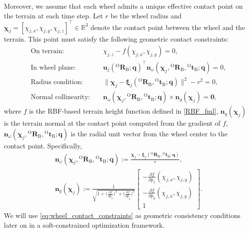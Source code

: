 \documentclass[journal,twoside,web]{ieeecolor}
\begin{document}
Moreover, we assume that each wheel admits a unique effective contact point on the terrain at each time step. Let $r$ be the wheel radius and \(\bm{\chi}_j=[\chi_{j,x},\chi_{j,y},\chi_{j,z}]^\top\in\mathbb{R}^3\) denote the contact point between the wheel and the terrain. 
This point must satisfy the following geometric contact constraints:
\begin{subequations}\label{eq:geom_constraints}
\begin{alignat}{2}
&\text{On terrain: }  && \chi_{j,z} - f(\chi_{j,x}, \chi_{j,y}) = 0,\\
&\text{In wheel plane: } && \mathbf{u}_j({}^{\text{O}}\mathbf{R}_\text{B}; \mathbf{q})^\top \mathbf{n}_\omega(\bm{\chi}_j,{}^{\text{O}}\mathbf{R}_\text{B}, {}^{\text{O}}\mathbf{t}_{\text{B}}; \mathbf{q}) = 0,\\
&\text{Radius condition: }  && \|\bm{\chi}_j \!-\! \bm\xi_j({}^{\text{O}}\mathbf{R}_\text{B},\! {}^{\text{O}}\mathbf{t}_{\text{B}}; \mathbf{q})\|^2 \!-\! r^2 \!=\! 0,\\
&\text{Normal collinearity: } && \mathbf{n}_\omega(\bm{\chi}_j,{}^{\text{O}}\mathbf{R}_\text{B}, {}^{\text{O}}\mathbf{t}_{\text{B}}; \mathbf{q}) \times \mathbf{n}_g(\bm{\chi}_j) \!=\! \mathbf{0},
\end{alignat}
\end{subequations}
where \(f\) is the RBF‑based terrain height function defined in \eqref{RBF_fml},
\(\mathbf{n}_g(\bm{\chi}_j)\) is the terrain normal at the contact point computed from the gradient of \(f\),  \(\mathbf{n}_\omega(\bm{\chi}_j,{}^{\text{O}}\mathbf{R}_\text{B}, {}^{\text{O}}\mathbf{t}_{\text{B}}; \mathbf{q})\) is the radial unit vector from the wheel center to the contact point. Specifically,
\begin{subequations}
\begin{align}
&\mathbf{n}_\omega(\bm{\chi}_j,{}^{\text{O}}\mathbf{R}_\text{B}, {}^{\text{O}}\mathbf{t}_{\text{B}}; \mathbf{q}) := \frac{\bm{\chi}_j - \bm\xi_j({}^{\text{O}}\mathbf{R}_\text{B}, {}^{\text{O}}\mathbf{t}_{\text{B}}; \mathbf{q})}{r},\\
&\mathbf{n}_g(\bm{\chi}_j) \!:=\! \frac{1}{\sqrt{1 \!\!+\! \!\bigl(\frac{\partial f}{\partial p_x}\bigr)^2\! \!+\!\! \bigl(\frac{\partial f}{\partial p_y}\bigr)^2}}\!
\begin{bmatrix}
-\frac{\partial f}{\partial p_x}(\chi_{j,x},\chi_{j,y}) \\[4pt]
-\frac{\partial f}{\partial p_y}(\chi_{j,x},\chi_{j,y}) \\[4pt]
1
\end{bmatrix}.
\end{align}
\label{eq:wheel_contact_constraints}
\end{subequations}
We will use \eqref{eq:wheel_contact_constraints} as geometric consistency conditions later on in a soft-constrained optimization framework.
\end{document}
